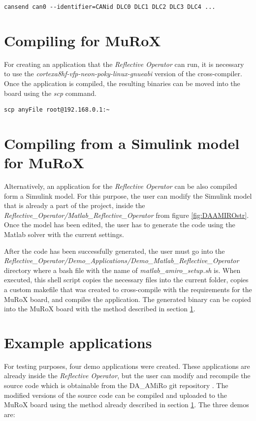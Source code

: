 \documentclass[12pt]{report}%
\begin{document}
\begin{lstlisting}[caption = CAN send format, label = CAN:debug, captionpos = b]
cansend can0 --identifier=CANid DLC0 DLC1 DLC2 DLC3 DLC4 ...
\end{lstlisting}

\section{Compiling for MuRoX}
\label{sec:poky}
For creating an application that the \textit{Reflective Operator} can run, it is necessary to use the \textit{cortexa8hf-vfp-neon-poky-linux-gnueabi} version of the cross-compiler. Once the application is compiled, the resulting binaries can be moved into the board using the \textit{scp} command.

\begin{lstlisting}[caption = moving files into MuRoX board \cite{AMiRo_Murox}, label = CAN:debug, captionpos = b]
scp anyFile root@192.168.0.1:~
\end{lstlisting}

\section{Compiling from a Simulink model for MuRoX}
\label{sec:matlab}
Alternatively, an application for the \textit{Reflective Operator} can be also compiled form a Simulink model. For this purpose, the user can modify the Simulink model that is already a part of the project, inside the \textit{Reflective\_Operator/Matlab\_Reflective\_Operator} from figure \ref{fig:DAAMIROstr}. Once the model has been edited, the user has to generate the code using the Matlab solver with the current settings.

After the code has been successfully generated, the user must go into the \textit{Reflective\_Operator/Demo\_Applications/Demo\_Matlab\_Reflective\_Operator} directory where a bash file with the name of \textit{matlab\_amiro\_setup.sh} is. When executed, this shell script copies the necessary files into the current folder, copies a custom makefile that was created to cross-compile with the requirements for the MuRoX board, and compiles the application. The generated binary can be copied into the MuRoX board with the method described in section \ref{sec:poky}.

\section{Example applications}
\label{sect:example}
For testing purposes, four demo applications were created. These applications are already inside the \textit{Reflective Operator}, but the user can modify and recompile the source code which is obtainable from the DA\_AMiRo git repository \cite{AMiRo_Git}. The modified versions of the source code can be compiled and uploaded to the MuRoX board using the method already described in section \ref{sec:poky}. The three demos are:
\end{document}
